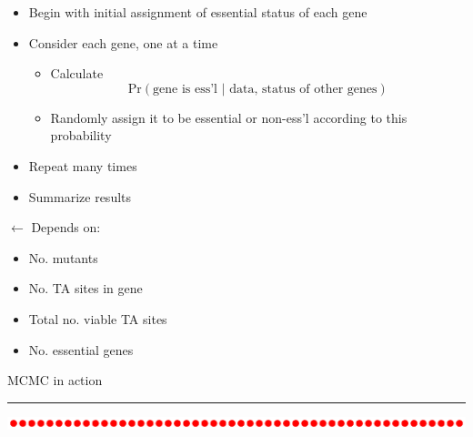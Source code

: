 \documentclass[12pt]{article}
\newcommand{\headsize}{\fontsize{35}{35} \selectfont}
\newcommand{\textsize}{\fontsize{30}{35} \selectfont}
\newcommand{\smallsize}{\fontsize{25}{30} \selectfont}
\newcommand{\smallersize}{\fontsize{20}{25} \selectfont}
\newcommand{\headcolor}{\color [cmyk]{0.72,0.67,0.33,0}}
\newcommand{\linecolor}{\color [named]{Thistle}}
\newcommand{\pointcolor}{\color [named]{Bittersweet}}
\begin{document}
\begin{minipage}[t]{6.5in}
\vspace*{0mm}

\begin{itemize} 
\smallsize
\setlength{\rightskip}{0pt plus 1fil} %
\setlength{\itemsep}{15pt}

\item Begin with initial assignment of essential status of each gene
\item Consider each gene, one at a time

\begin{itemize}
\item Calculate 
{\smallersize \headcolor $$\text{Pr}(\text{gene is ess'l } | \text{ data, status of other genes})$$}

\vspace{-12mm}
\item Randomly assign it to be essential or non-ess'l according to this
probability
\end{itemize}


\item Repeat many times

\item Summarize results

\end{itemize} 
\end{minipage}
\hfill
\begin{minipage}[t]{3.3in}
\smallsize

\vspace{56mm}
{\pointcolor $\longleftarrow$ Depends on:

\begin{itemize}
\smallersize
\item No. mutants
\item No. TA sites in gene
\item Total no. viable TA sites
\item No. essential genes
\end{itemize}}
\end{minipage}


\newpage

\headsize \headcolor
\centerline{MCMC in action}
\linecolor \noindent \rule[3mm]{10in}{2mm}

\vspace{5mm}
\normalcolor \textsize 

\vspace{-15mm}
\centerline{\includegraphics[angle=270]{Figs/mcmc1.ps}}
\end{document}
